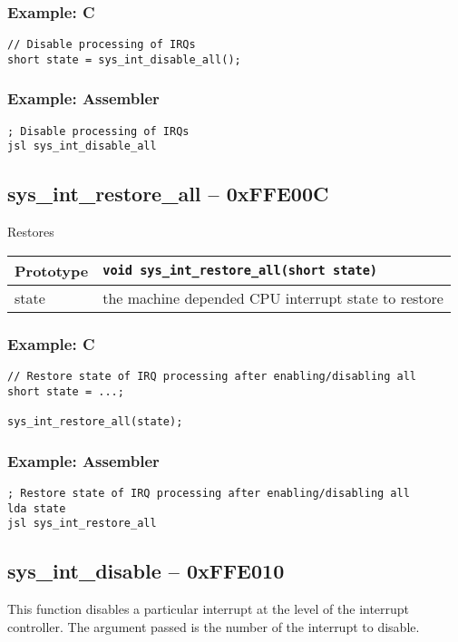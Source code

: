 \subsubsection*{Example: C}
\begin{lstlisting}
// Disable processing of IRQs
short state = sys_int_disable_all();
\end{lstlisting}

\subsubsection*{Example: Assembler}
\begin{verbatim}
; Disable processing of IRQs
jsl sys_int_disable_all
\end{verbatim}


\subsection*{sys\_int\_restore\_all -- 0xFFE00C}
Restores 

\bigskip

\begin{tabular}{|l||l|} \hline
Prototype & \lstinline!void sys_int_restore_all(short state)! \\ \hline
state & the machine depended CPU interrupt state to restore
\end{tabular}

\subsubsection*{Example: C}
\begin{lstlisting}
// Restore state of IRQ processing after enabling/disabling all
short state = ...;

sys_int_restore_all(state);
\end{lstlisting}

\subsubsection*{Example: Assembler}
\begin{verbatim}
; Restore state of IRQ processing after enabling/disabling all
lda state
jsl sys_int_restore_all
\end{verbatim}

\subsection*{sys\_int\_disable -- 0xFFE010}
This function disables a particular interrupt at the level of the interrupt controller. The argument passed is the number of the interrupt to disable.

